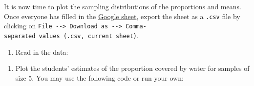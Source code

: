 \documentclass[letterpaper,10pt,twoside,]{pinp}
\providecommand{\tightlist}{%
  \setlength{\itemsep}{0pt}\setlength{\parskip}{0pt}}
\begin{document}
It is now time to plot the sampling distributions of the proportions and
means. Once everyone has filled in the
\href{https://docs.google.com/spreadsheets/d/1Mnxeq9nQcTdQycZ7S_62fYFiNC5_a3fibsyodzfwO58/edit?usp=sharing}{Google
sheet}, export the sheet as a \texttt{.csv} file by clicking on
\texttt{File\ -\/-\textgreater{}\ Download\ as\ -\/-\textgreater{}\ Comma-separated\ values\ (.csv,\ current\ sheet)}.

\begin{enumerate}
\def\labelenumi{\arabic{enumi}.}
\tightlist
\item
  Read in the data:
\end{enumerate}

\begin{Shaded}
\begin{Highlighting}[]
\StringTok{ }\NormalTok{(}\NormalTok{, }\NormalTok{)}
\StringTok{ }\NormalTok{water_results[,}\OperatorTok{:}\NormalTok{]}
\StringTok{ }\NormalTok{water_results[}\NormalTok{(water_results), ]}

\StringTok{ }
\end{Highlighting}
\end{Shaded}

\begin{enumerate}
\def\labelenumi{\arabic{enumi}.}
\setcounter{enumi}{1}
\tightlist
\item
  Plot the students' estimates of the proportion covered by water for
  samples of size 5. You may use the following code or run your own:
\end{enumerate}

\begin{Shaded}
\begin{Highlighting}[]
\NormalTok{(}\NormalTok{(water_results[,}\NormalTok{]), }
      \NormalTok{(}\NormalTok{,}\NormalTok{),}
      \NormalTok{,}
      \NormalTok{, }
      \NormalTok{(}\OperatorTok{/}\NormalTok{), }
      \NormalTok{)}
\end{Highlighting}
\end{Shaded}
\end{document}
